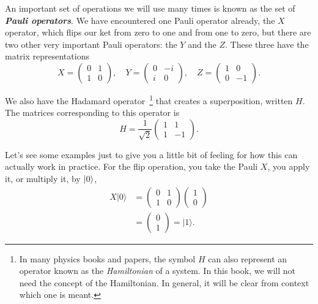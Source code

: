 An important set of operations we will use many times is known as the set of \textbf{\emph{Pauli operators}}. We have encountered one Pauli operator already, the $X$ operator, which flips our ket from zero to one and from one to zero, but there are two other very important Pauli operators: the $Y$ and the $Z$. These three have the matrix representations 
\begin{equation}
    X=\left(\begin{array}{ll}
    0 & 1 \\
    1 & 0
    \end{array}\right), \quad
    Y=\left(\begin{array}{cc}
    0 & -i \\
    i & 0
    \end{array}\right), \quad
    Z=\left(\begin{array}{cc}
    1 & 0 \\
    0 & -1
    \end{array}\right).
\end{equation}

We also have the Hadamard operator~\footnote{In many physics books and papers, the symbol $H$ can also represent an operator known as the \emph{Hamiltonian} of a system.  In this book, we will not need the concept of the Hamiltonian. In general, it will be clear from context which one is meant.} that creates a superposition, written $H$.  The matrices corresponding to this operator is
\begin{equation}
H=\frac{1}{\sqrt{2}}\left(\begin{array}{cc}
1 & 1 \\
1 & -1
\end{array}\right).
\end{equation}


Let's see some examples just to give you a little bit of feeling for how this can actually work in practice. For the flip operation, you take the Pauli $X$, you apply it, or multiply it, by $\left| 0 \right\rangle$,
\begin{equation}
\begin{aligned}
X|0\rangle &=\left(\begin{array}{ll}
0 & 1 \\
1 & 0
\end{array}\right)\left(\begin{array}{l}
1 \\
0
\end{array}\right) \\
&=\left(\begin{array}{l}
0 \\
1
\end{array}\right)=|1\rangle.
\end{aligned}
\end{equation}

